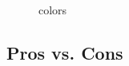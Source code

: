 	 \begin{figure}[!h]
  \centering
  \caption{colors}
  \label{fig:colors}
\end{figure}


	


\subsection{Pros vs. Cons} 
	




